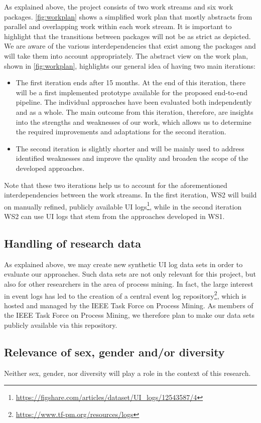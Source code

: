 As explained above, the project consists of two work streams and six work packages. 
\autoref{fig:workplan} shows a simplified work plan that mostly abstracts from parallel and overlapping work within each work stream. It is important to highlight that the transitions between packages will not be as strict as depicted. We are aware of the various interdependencies that exist among the packages and will take them into account appropriately.  
The abstract view on the work plan, shown in \autoref{fig:workplan}, highlights our general idea of having two main iterations:
\begin{itemize}
	\item The first iteration ends after 15 months. At the end of this iteration, there will be a first implemented prototype available for the proposed end-to-end pipeline. The individual approaches have been evaluated both independently and as a whole. The main outcome from this iteration, therefore, are insights into the strengths and weaknesses of our work, which allows us to determine the required improvements and adaptations for the second iteration. 
	\item The second iteration is slightly shorter and will be mainly used to address identified weaknesses and improve the quality and broaden the scope of the developed approaches.
\end{itemize} 

Note that these two iterations help us to account for the aforementioned interdependencies between the work streams. In the first iteration, WS2 will build on manually refined, publicly available UI logs\footnote{\url{https://figshare.com/articles/dataset/UI_logs/12543587/4}}, while in the second iteration WS2 can use UI logs that stem from the approaches developed in WS1.  

\subsection{Handling of research data}

As explained above, we may create new synthetic UI log data sets in order to evaluate our approaches. Such data sets are not only relevant for this project, but also for other researchers in the area of process mining. In fact, the large interest in event logs has led to the creation of a central event log repository\footnote{\url{https://www.tf-pm.org/resources/logs}}, which is hosted and managed by the IEEE Task Force on Process Mining. As members of the IEEE Task Force on Process Mining, we therefore plan to make our data sets publicly available via this repository.


\subsection{Relevance of sex, gender and/or diversity}

Neither sex, gender, nor diversity will play a role in the context of this research. 
